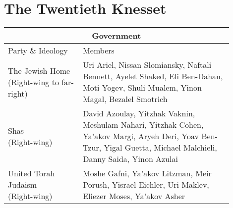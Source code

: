\chapter{The Twentieth Knesset}
\label{append:the_20th_knesset}

\begin{table}
\tiny
\centering
\begin{tabular}{|p{0.3\linewidth}|p{0.6\linewidth}|}
\hline
\multicolumn{2}{|c|}{ Government }                                                                                                                                                                                                                                                                                                                                                                                                                                                \\
\hline
Party \& Ideology          & Members \\
\hline
\makecell{The Jewish Home \\ (Right-wing to far-right)} & Uri Ariel, Nissan Slomiansky, Naftali Bennett, Ayelet Shaked, Eli Ben-Dahan, Moti Yogev, Shuli Mualem, Yinon Magal, Bezalel Smotrich                                                                                                                                                                                                                                                                                                 \\
\hline
\makecell{Shas \\ (Right-wing)}  & David Azoulay, Yitzhak Vaknin, Meshulam Nahari, Yitzhak Cohen, Ya'akov Margi, Aryeh Deri, Yoav Ben-Tzur, Yigal Guetta, Michael Malchieli, Danny Saida, Yinon Azulai                                                                                                                                                                                                                                                                                         \\
\hline
\makecell{United Torah Judaism \\ (Right-wing)}  & Moshe Gafni, Ya'akov Litzman, Meir Porush, Yisrael Eichler, Uri Maklev, Eliezer Moses, Ya'akov Asher                                                                                                                                                                                                                                                                                                                                                        \\

\end{tabular}
\end{table}
